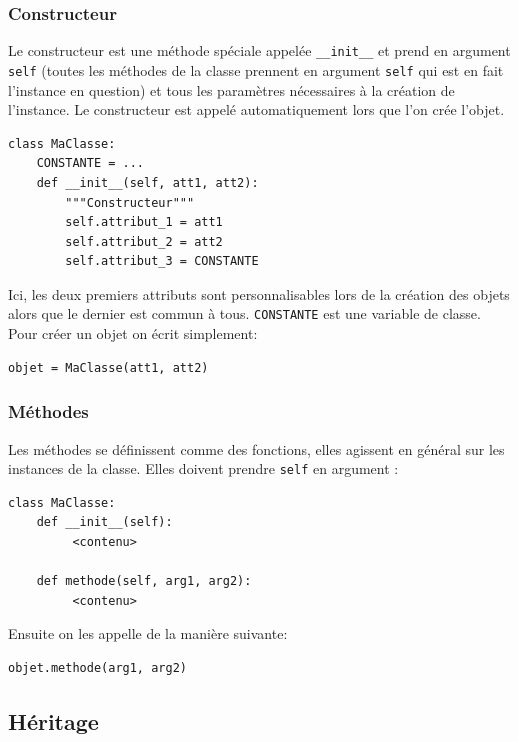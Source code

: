 \documentclass[a4paper, 10pt]{article}
\newcommand{\code}[1]{{\small\texttt{#1}}}
\begin{document}
\subsubsection{Constructeur}\index{\code{\_\_init\_\_}}

Le constructeur est une méthode spéciale appelée {\footnotesize\verb|__init__|} et prend en argument \code{self}\index{\code{self}} (toutes les méthodes de la classe prennent en argument \code{self} qui est en fait l'instance en question) et tous les paramètres nécessaires à la création de l'instance. Le constructeur est appelé automatiquement lors que l'on crée l'objet.
\begin{verbatim}
class MaClasse:
    CONSTANTE = ...
    def __init__(self, att1, att2):
        """Constructeur"""
        self.attribut_1 = att1
        self.attribut_2 = att2
        self.attribut_3 = CONSTANTE
\end{verbatim}
Ici, les deux premiers attributs sont personnalisables lors de la création des objets alors que le dernier est commun à tous. \code{CONSTANTE} est une variable de classe. Pour créer un objet on écrit simplement: 
\begin{verbatim}
objet = MaClasse(att1, att2)
\end{verbatim}

\subsubsection{Méthodes}
Les méthodes se définissent comme des fonctions, elles agissent en général sur les instances de la classe. Elles doivent prendre \code{self} en argument :
\begin{verbatim}
class MaClasse:
    def __init__(self):
         <contenu>
    
    def methode(self, arg1, arg2):
         <contenu>
\end{verbatim}

Ensuite on les appelle de la manière suivante:
\begin{verbatim}
objet.methode(arg1, arg2)
\end{verbatim}


\subsection{Héritage}
\end{document}
